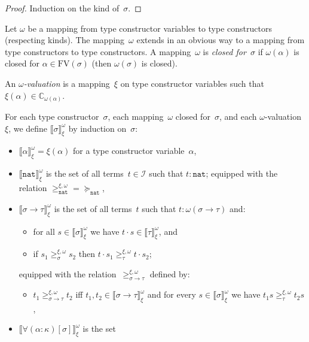 \documentclass[runningheads,a4paper]{llncs}
\newcommand{\Iterms}{\mathcal{I}}
\newcommand{\arrtype}{\rightarrow}
\newcommand{\app}[2]{#1 \cdot #2}
\newcommand{\FV}{\mathrm{FV}}
\newcommand{\nat}{\mathtt{nat}}
\newcommand{\Cb}{\mathbb{C}}
\newcommand{\val}[3]{\ensuremath{\llbracket#1\rrbracket_{#2}^{#3}}}
\newcommand{\gteq}[3]{\ensuremath{\ge_{#1}^{#2,#3}}}
\begin{document}
\begin{proof}
  Induction on the kind of~$\sigma$.
\end{proof}

\begin{definition}\label{def_wm_valuation}\normalfont
  Let $\omega$ be a mapping from type constructor variables to type
  constructors (respecting kinds). The mapping~$\omega$ extends in an
  obvious way to a mapping from type constructors to type
  constructors. A mapping~$\omega$ is \emph{closed for~$\sigma$} if
  $\omega(\alpha)$ is closed for $\alpha \in \FV(\sigma)$ (then
  $\omega(\sigma)$ is closed).

  An \emph{$\omega$-valuation} is a mapping~$\xi$ on type constructor
  variables such that $\xi(\alpha) \in \Cb_{\omega(\alpha)}$.

  For each type constructor~$\sigma$, each mapping~$\omega$ closed
  for~$\sigma$, and each $\omega$-valuation~$\xi$, we define
  $\val{\sigma}{\xi}{\omega}$ by induction on~$\sigma$:
  \begin{itemize}
  \item $\val{\alpha}{\xi}{\omega} = \xi(\alpha)$ for a type
    constructor variable~$\alpha$,
  \item $\val{\nat}{\xi}{\omega}$ is the set of all terms~$t \in
    \Iterms$ such that $t : \nat$; equipped with the relation
    $\gteq{\nat}{\xi}{\omega} = \succeq_\nat$,
  \item $\val{\sigma \arrtype \tau}{\xi}{\omega}$ is the set of all
    terms~$t$ such that $t : \omega(\sigma\arrtype\tau)$ and:
    \begin{itemize}
    \item for all $s \in \val{\sigma}{\xi}{\omega}$ we have
      $\app{t}{s} \in \val{\tau}{\xi}{\omega}$, and
    \item if $s_1 \gteq{\sigma}{\xi}{\omega} s_2$ then $\app{t}{s_1}
      \gteq{\tau}{\xi}{\omega} \app{t}{s_2}$;
    \end{itemize}
    equipped with the
    relation~$\gteq{\sigma\arrtype\tau}{\xi}{\omega}$ defined by:
    \begin{itemize}
    \item $t_1 \gteq{\sigma\arrtype\tau}{\xi}{\omega} t_2$ iff
      $t_1,t_2 \in \val{\sigma\arrtype\tau}{\xi}{\omega}$ and for
      every $s \in \val{\sigma}{\xi}{\omega}$ we have $t_1 s
      \gteq{\tau}{\xi}{\omega} t_2 s$,
    \end{itemize}
  \item $\val{\forall(\alpha:\kappa)[\sigma]}{\xi}{\omega}$ is the set

\end{itemize}
\end{definition}
\end{document}
